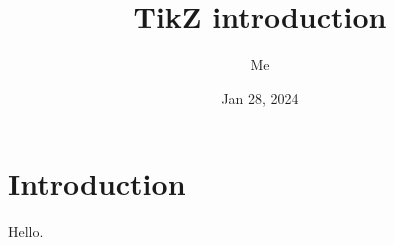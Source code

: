 \documentclass[a4paper, 12pt]{book}
\title{TikZ introduction}
\author{Me}
\date{Jan 28, 2024}
\begin{document}
\maketitle
\tableofcontents
\chapter{Introduction}
Hello.
\end{document}
